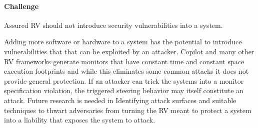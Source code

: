 \paragraph{Challenge} Assured RV should not introduce security
vulnerabilities into a system. 

Adding more software or  hardware to a system  has the potential to  
introduce vulnerabilities that that can be exploited by  an
attacker.  Copilot and many other RV frameworks generate monitors that
have constant time and constant space execution footprints and
while this eliminates some common attacks it does not provide general
protection. If an attacker can trick the systems into a monitor
specification violation, the triggered steering behavior may itself
constitute an attack.  Future research is needed in  Identifying attack surfaces
and suitable techniques to thwart adversaries from turning the RV
meant to protect a system into a liability that exposes the system to
attack.



